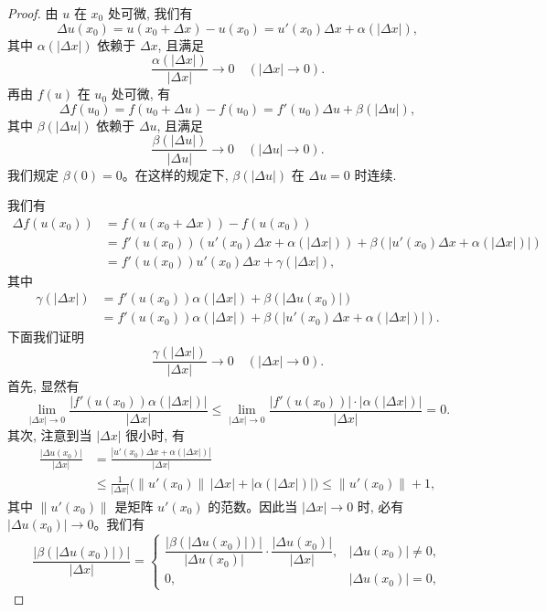 \begin{proof}
由 $u$ 在 $x_0$ 处可微, 我们有
\[
  \Delta u(x_0)=u(x_0+\Delta x)-u(x_0)
  =u'(x_0)\Delta x+\alpha(|\Delta x|),
\]
其中 $\alpha(|\Delta x|)$ 依赖于 $\Delta x$, 且满足
\[
  \frac{\alpha(|\Delta x|)}{|\Delta x|}\to0\quad(|\Delta x|\to0).
\]
再由 $f(u)$ 在 $u_0$ 处可微, 有
\[
  \Delta f(u_0)=f(u_0+\Delta u)-f(u_0)=f'(u_0)\Delta u+\beta(|\Delta u|),
\]
其中 $\beta(|\Delta u|)$ 依赖于 $\Delta u$, 且满足
\[
  \frac{\beta(|\Delta u|)}{|\Delta u|}\to0\quad(|\Delta u|\to0).
\]
我们规定 $\beta(0)=0$。在这样的规定下, $\beta(|\Delta u|)$ 在 $\Delta u=0$ 时连续.

我们有
\[
\begin{aligned}
  \Delta f(u(x_0))
  &=f(u(x_0+\Delta x))-f(u(x_0))\\
  &=f'(u(x_0))(u'(x_0)\Delta x+\alpha(|\Delta x|))
  +\beta(|u'(x_0)\Delta x+\alpha(|\Delta x|)|)\\
  &=f'(u(x_0))u'(x_0)\Delta x+\gamma(|\Delta x|),
\end{aligned}
\]
其中
\[
\begin{aligned}
  \gamma(|\Delta x|)
  &=f'(u(x_0))\alpha(|\Delta x|)
  +\beta(|\Delta u(x_0)|)\\
  &=f'(u(x_0))\alpha(|\Delta x|)
  +\beta(|u'(x_0)\Delta x+\alpha(|\Delta x|)|).
\end{aligned}
\]
下面我们证明
\[
  \frac{\gamma(|\Delta x|)}{|\Delta x|}\to0\quad(|\Delta x|\to0).
\]
首先, 显然有
\begin{equation}
  \lim_{|\Delta x|\to0}
  \frac{|f'(u(x_0))\alpha(|\Delta x|)|}{|\Delta x|}
  \leqslant
  \lim_{|\Delta x|\to0}
  \frac{|f'(u(x_0))|\cdot|\alpha(|\Delta x|)|}{|\Delta x|}=0.
\label{eq:ma-14-2-1}
\end{equation}
其次, 注意到当 $|\Delta x|$ 很小时, 有
\[
\begin{aligned}
  \frac{|\Delta u(x_0)|}{|\Delta x|}
  &=\frac{|u'(x_0)\Delta x+\alpha(|\Delta x|)|}{|\Delta x|}\\
  &\leqslant \frac1{|\Delta x|}\bigl(\|u'(x_0)\|\,|\Delta x|+|\alpha(|\Delta x|)|\bigr)
  \leqslant \|u'(x_0)\|+1,
\end{aligned}
\]
其中 $\|u'(x_0)\|$ 是矩阵 $u'(x_0)$ 的范数。因此当 $|\Delta x|\to0$ 时, 必有 $|\Delta u(x_0)|\to0$。我们有
\[
  \frac{|\beta(|\Delta u(x_0)|)|}{|\Delta x|}
  =
  \begin{cases}
    \dfrac{|\beta(|\Delta u(x_0)|)|}{|\Delta u(x_0)|}
    \cdot\dfrac{|\Delta u(x_0)|}{|\Delta x|}, &|\Delta u(x_0)|\ne0,\\[1.2em]
    0, &|\Delta u(x_0)|=0,

\end{cases}\]
\end{proof}
